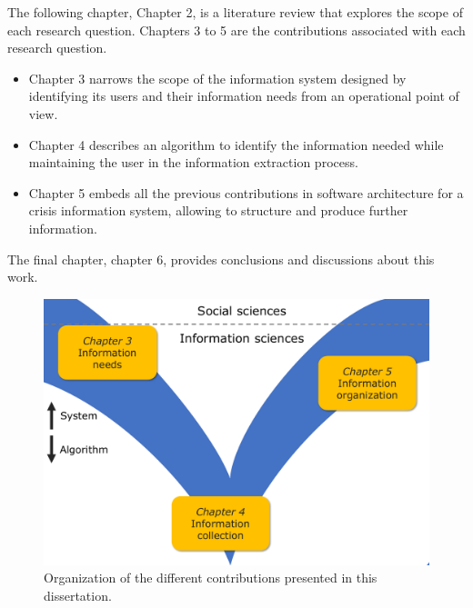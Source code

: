The following chapter, Chapter 2, is a literature review that explores the scope of each research question.
Chapters 3 to 5 are the contributions associated with each research question.

\begin{itemize}
    \item Chapter 3 narrows the scope of the information system designed by identifying its users and their information needs from an operational point of view.
    \item Chapter 4 describes an algorithm to identify the information needed while maintaining the user in the information extraction process.
    \item Chapter 5 embeds all the previous contributions in software architecture for a crisis information system, allowing to structure and produce further information.
\end{itemize}

The final chapter, chapter 6, provides conclusions and discussions about this work.

\begin{figure}[htb]
    \centering
    \includegraphics[width=\textwidth]{figures/chap-1/dissertation-plan.pdf}
    \caption{Organization of the different contributions presented in this dissertation.}
    \label{context:plan}
\end{figure}

